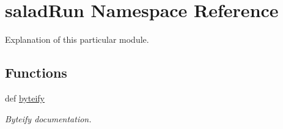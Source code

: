 \hypertarget{namespacesaladRun}{\section{salad\-Run Namespace Reference}
\label{namespacesaladRun}
}


Explanation of this particular module.  


\subsection*{Functions}
\begin{DoxyCompactItemize}
\item 
def \hyperlink{namespacesaladRun_aa4dad382993990ca7e6edf9262419b99}{byteify}
\begin{DoxyCompactList}\small\item\em Byteify documentation. \end{DoxyCompactList}\end{DoxyCompactItemize}
